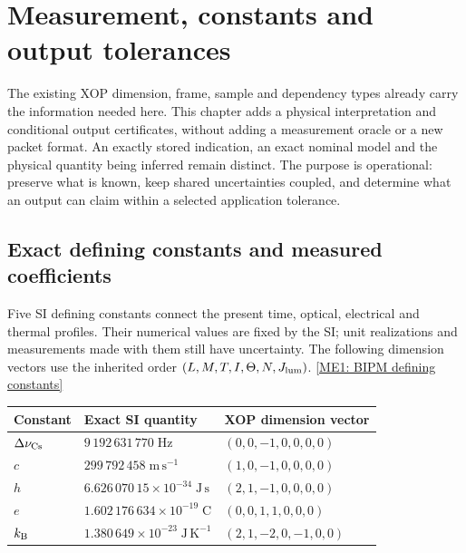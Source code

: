 \section{Measurement, constants and output tolerances}
\label{r13-measurement-core}

The existing XOP dimension, frame, sample and dependency types already carry
the information needed here. This chapter adds a physical interpretation and
conditional output certificates, without adding a measurement oracle or a new
packet format. An exactly stored indication, an exact nominal model and the
physical quantity being inferred remain distinct. The purpose is operational:
preserve what is known, keep shared uncertainties coupled, and determine what
an output can claim within a selected application tolerance.

\subsection{Exact defining constants and measured coefficients}
\label{r13-measurement-constants}

Five SI defining constants connect the present time, optical, electrical
and thermal profiles. Their numerical values are fixed by the SI; unit
realizations and measurements made with them still have uncertainty.
The following dimension vectors use the inherited order
$(L,M,T,I,\Theta,N,J_{\rm lum})$.
\href{https://www.bipm.org/en/measurement-units/si-defining-constants}{[ME1: BIPM defining constants]}

\begin{center}\small
\begin{tabularx}{\linewidth}{P{.11\linewidth}P{.45\linewidth}Y}
\toprule
Constant & Exact SI quantity & XOP dimension vector\\
\midrule
$\Delta\nu_{\rm Cs}$ & $9\,192\,631\,770\;\mathrm{Hz}$ & $(0,0,-1,0,0,0,0)$\\
$c$ & $299\,792\,458\;\mathrm{m\,s^{-1}}$ & $(1,0,-1,0,0,0,0)$\\
$h$ & $6.626\,070\,15\times10^{-34}\;\mathrm{J\,s}$ & $(2,1,-1,0,0,0,0)$\\
$e$ & $1.602\,176\,634\times10^{-19}\;\mathrm{C}$ & $(0,0,1,1,0,0,0)$\\
$k_{\rm B}$ & $1.380\,649\times10^{-23}\;\mathrm{J\,K^{-1}}$ & $(2,1,-2,0,-1,0,0)$\\
\bottomrule
\end{tabularx}\end{center}

